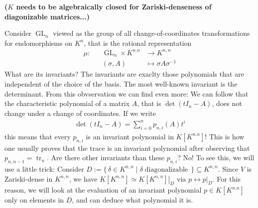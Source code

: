 \begin{example}
  \textbf{($K$ needs to be algebraically closed for Zariski-denseness of diagonizable matrices...)}
  
  Consider $\operatorname{GL}_n$ viewed as the group of all change-of-coordinates transformations for endomorphisms on $K^n$, that is the rational representation
  \begin{equation}
    \begin{aligned}
      \mu \colon && \operatorname{GL}_n \times K^{n.n} & \longrightarrow K^{n,n} \\
      && (\sigma,A) &\longmapsto \sigma A \sigma^{-1}
    \end{aligned}
  \end{equation}
  What are its invariants?
  The invariants are exaclty those polynomials that are independent of the choice of the basis.
  The most well-known invariant is the determinant.
  From this obvservation we can find even more:
  We can follow that the characteristic polynomial of a matrix $A$, that is $\operatorname{det} (tI_n - A)$, does not change under a change of coordinates.
  If we write
  \begin{equation}
    \begin{aligned}
      \operatorname{det} (tI_n - A) = \sum_{i=0}^n p_{n,i} (A) t^i
    \end{aligned}
  \end{equation}
  this means that every $p_{n,i}$ is an invariant polynomial in $K[K^{n.n}]$!
  This is how one usually proves that the trace is an invariant polynomial after observing that $p_{n,n-1} = \operatorname{tr}_n$.
  Are there other invariants than these $p_{n,i}$?
  No!
  To see this, we will use a little trick:
  Consider $D := \{\, \delta \in K^{n,n} \mid \delta \operatorname{diagonalizable} \,\} \subseteq K^{n,n}$.
  Since $V$ is Zariski-dense in $K^{n,n}$, we have $K[K^{n,n}] \simeq \left. K[K^{n,n}] \right|_{D}$ via $p \leftrightarrow \left. p \right|_{D}$.
  For this reason, we will look at the evaluation of an invariant polynomial $p \in K[K^{n.n}] $ only on elements in $D$, and can deduce what polynomial it is.


\end{example}
